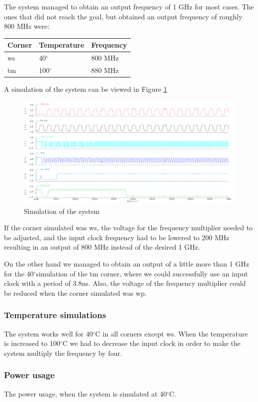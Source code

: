 \documentclass[a4paper,12pt]{article} \usepackage{graphicx}
\newcommand{\degree}{\ensuremath{^\circ}}
\begin{document}
The system managed to obtain an output frequency of 1 GHz for most cases. The ones that
did not reach the goal, but obtained an output frequency of roughly 800 MHz were:

\begin{tabular}{l l l}
Corner & Temperature & Frequency\\ \hline
ws & 40\degree & 800 MHz\\
tm & 100\degree & 880 MHz
\end{tabular}

A simulation of the system can be viewed in Figure \ref{fig:sim_system}
\begin{figure}[h]
\centering
\includegraphics[width=\textwidth]{../Bilder/Layout/simulation_system.png}
\caption{Simulation of the system}
\label{fig:sim_system}
\end{figure}

If the corner simulated was ws, the voltage for the frequency multiplier
needed to be adjusted, and the input clock frequency had to be lowered 
to 200 MHz resulting in an output of 800 MHz instead of the desired 1 GHz.

On the other hand we managed to obtain an output of a little more than 1 GHz for
the 40\degree simulation of the tm corner, where we could successfully use an 
input clock with a period of 3.8ns.
Also, the voltage of the frequency multiplier could be reduced when the corner simulated was wp.

\subsubsection{Temperature simulations}
The system works well for 40\degree C in all corners except ws.
When the temperature is increased to 100\degree C we had to decrease 
the input clock in order to make the system multiply the frequency
by four.

\subsubsection{Power usage}
The power usage, when the system is simulated at 40\degree C.
\end{document}
